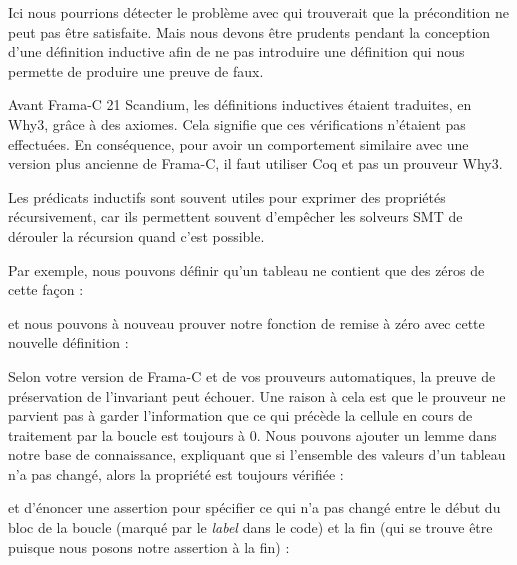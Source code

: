 Ici nous pourrions détecter le problème avec  qui
trouverait que la précondition ne peut pas être satisfaite. Mais nous devons
être prudents pendant la conception d'une définition inductive afin de ne pas
introduire une définition qui nous permette de produire une preuve de faux.


\begin{Warning}
  Avant Frama-C 21 Scandium, les définitions inductives étaient traduites,
  en Why3, grâce à des axiomes. Cela signifie que ces vérifications n'étaient
  pas effectuées. En conséquence, pour avoir un comportement similaire avec
  une version plus ancienne de Frama-C, il faut utiliser Coq et pas un prouveur
  Why3.
\end{Warning}



Les prédicats inductifs sont souvent utiles pour exprimer des propriétés
récursivement, car ils permettent souvent d'empêcher les solveurs SMT de
dérouler la récursion quand c'est possible.


Par exemple, nous pouvons définir qu'un tableau ne contient que des zéros de
cette façon :




et nous pouvons à nouveau prouver notre fonction de remise à zéro avec cette
nouvelle définition :






Selon votre version de Frama-C et de vos prouveurs automatiques, la preuve de
préservation de l'invariant peut échouer. Une raison à cela est que le prouveur ne
parvient pas à garder l'information que ce qui précède la cellule en cours de
traitement par la boucle est toujours à 0. Nous pouvons ajouter un lemme dans
notre base de connaissance, expliquant que si l'ensemble des valeurs d'un tableau
n'a pas changé, alors la propriété est toujours vérifiée :






et d'énoncer une assertion pour spécifier ce qui n'a pas changé entre le début
du bloc de la boucle (marqué par le \textit{label}  dans le code)
et la fin (qui se trouve être  puisque nous posons notre
assertion à la fin) :



